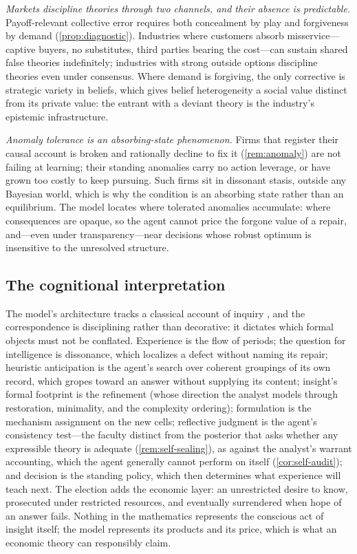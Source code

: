 \documentclass[11pt]{article}
\theoremstyle{definition}
\begin{document}
\emph{Markets discipline theories through two channels, and their absence is predictable.}
Payoff-relevant collective error requires both concealment by play and forgiveness by demand (\cref{prop:diagnostic}).
Industries where customers absorb misservice---captive buyers, no substitutes, third parties bearing the cost---can sustain shared false theories indefinitely; industries with strong outside options discipline theories even under consensus.
Where demand is forgiving, the only corrective is strategic variety in beliefs, which gives belief heterogeneity a social value distinct from its private value: the entrant with a deviant theory is the industry's epistemic infrastructure.

\emph{Anomaly tolerance is an absorbing-state phenomenon.}
Firms that register their causal account is broken and rationally decline to fix it (\cref{rem:anomaly}) are not failing at learning; their standing anomalies carry no action leverage, or have grown too costly to keep pursuing.
Such firms sit in dissonant stasis, outside any Bayesian world, which is why the condition is an absorbing state rather than an equilibrium.
The model locates where tolerated anomalies accumulate: where consequences are opaque, so the agent cannot price the forgone value of a repair, and---even under transparency---near decisions whose robust optimum is insensitive to the unresolved structure.

\subsection{The cognitional interpretation}

The model's architecture tracks a classical account of inquiry \citep{Lonergan1992,RyallWilkins2018}, and the correspondence is disciplining rather than decorative: it dictates which formal objects must not be conflated.
Experience is the flow of periods; the question for intelligence is dissonance, which localizes a defect without naming its repair; heuristic anticipation is the agent's search over coherent groupings of its own record, which gropes toward an answer without supplying its content; insight's formal footprint is the refinement (whose direction the analyst models through restoration, minimality, and the complexity ordering); formulation is the mechanism assignment on the new cells; reflective judgment is the agent's consistency test---the faculty distinct from the posterior that asks whether any expressible theory is adequate (\cref{rem:self-sealing}), as against the analyst's warrant accounting, which the agent generally cannot perform on itself (\cref{cor:self-audit}); and decision is the standing policy, which then determines what experience will teach next.
The election adds the economic layer: an unrestricted desire to know, prosecuted under restricted resources, and eventually surrendered when hope of an answer fails.
Nothing in the mathematics represents the conscious act of insight itself; the model represents its products and its price, which is what an economic theory can responsibly claim.
\end{document}
